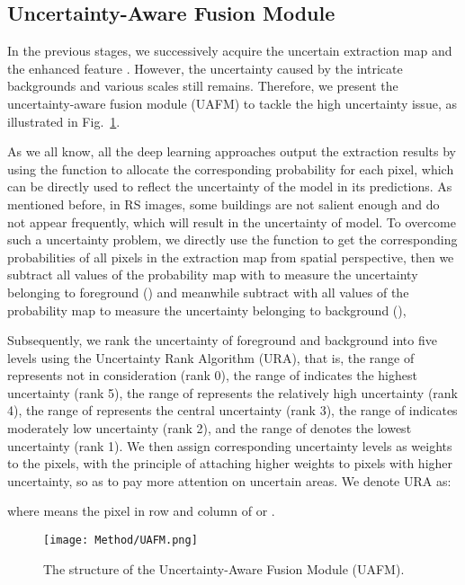 \documentclass[lettersize,journal]{IEEEtran}
\begin{document}
\subsection{Uncertainty-Aware Fusion Module}
\label{sec:UAFM}
In the previous stages, we successively acquire the uncertain extraction map  and the enhanced feature . However, the uncertainty caused by the intricate backgrounds and various scales still remains. Therefore, we present the uncertainty-aware fusion module (UAFM) to tackle the high uncertainty issue, as illustrated in Fig.~\ref{fig_5}.
\par
As we all know, all the deep learning approaches output the extraction results by using the  function to allocate the corresponding probability for each pixel, which can be directly used to reflect the uncertainty of the model in its predictions. As mentioned before, in RS images, some buildings are not salient enough and do not appear frequently, which will result in the uncertainty of model. To overcome such a uncertainty problem, we directly use the  function to get the corresponding probabilities of all pixels in the extraction map  from spatial perspective, then we subtract all values of the probability map with  to measure the uncertainty belonging to foreground () and meanwhile subtract  with all values of the probability map to measure the uncertainty belonging to background (),

Subsequently, we rank the uncertainty of foreground and background into five levels using the Uncertainty Rank Algorithm (URA), that is, the range of  represents not in consideration (rank 0), the range of  indicates the highest uncertainty (rank 5), the range of  represents the relatively high uncertainty (rank 4), the range of  represents the central uncertainty (rank 3), the range of  indicates moderately low uncertainty (rank 2), and the range of  denotes the lowest uncertainty (rank 1). We then assign corresponding uncertainty levels as weights to the pixels, with the principle of attaching higher weights to pixels with higher uncertainty, so as to pay more attention on uncertain areas. We denote URA as:

where  means the pixel in  row and  column of  or .

\begin{figure}[]
\centering
\texttt{[image: Method/UAFM.png]}
\caption{The structure of the Uncertainty-Aware Fusion Module (UAFM).}
\vspace{-1.0em}
\label{fig_5}
\end{figure}
\end{document}
